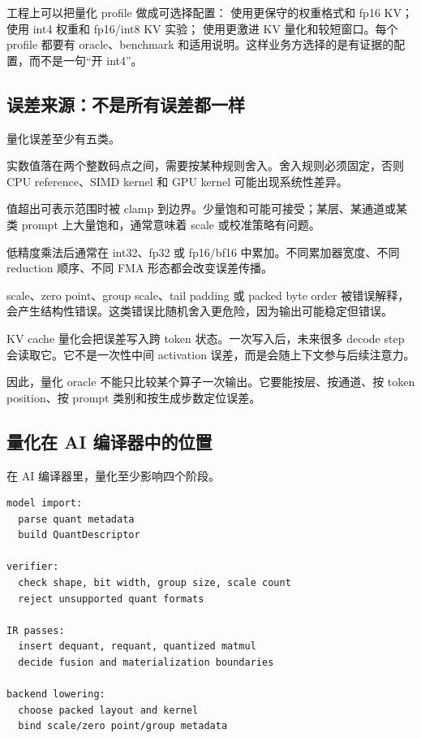 工程上可以把量化 profile 做成可选择配置： 使用更保守的权重格式和 fp16 KV； 使用 int4 权重和 fp16/int8 KV 实验； 使用更激进 KV 量化和较短窗口。每个 profile 都要有 oracle、benchmark 和适用说明。这样业务方选择的是有证据的配置，而不是一句“开 int4”。

\subsection{误差来源：不是所有误差都一样}

量化误差至少有五类。

 实数值落在两个整数码点之间，需要按某种规则舍入。舍入规则必须固定，否则 CPU reference、SIMD kernel 和 GPU kernel 可能出现系统性差异。

 值超出可表示范围时被 clamp 到边界。少量饱和可能可接受；某层、某通道或某类 prompt 上大量饱和，通常意味着 scale 或校准策略有问题。

 低精度乘法后通常在 int32、fp32 或 fp16/bf16 中累加。不同累加器宽度、不同 reduction 顺序、不同 FMA 形态都会改变误差传播。

 scale、zero point、group scale、tail padding 或 packed byte order 被错误解释，会产生结构性错误。这类错误比随机舍入更危险，因为输出可能稳定但错误。

 KV cache 量化会把误差写入跨 token 状态。一次写入后，未来很多 decode step 会读取它。它不是一次性中间 activation 误差，而是会随上下文参与后续注意力。

因此，量化 oracle 不能只比较某个算子一次输出。它要能按层、按通道、按 token position、按 prompt 类别和按生成步数定位误差。

\subsection{量化在 AI 编译器中的位置}

在 AI 编译器里，量化至少影响四个阶段。

\begin{lstlisting}[numbers=none,caption={量化事实在编译流水线中的流动}]
model import:
  parse quant metadata
  build QuantDescriptor

verifier:
  check shape, bit width, group size, scale count
  reject unsupported quant formats

IR passes:
  insert dequant, requant, quantized matmul
  decide fusion and materialization boundaries

backend lowering:
  choose packed layout and kernel
  bind scale/zero point/group metadata
\end{lstlisting}

